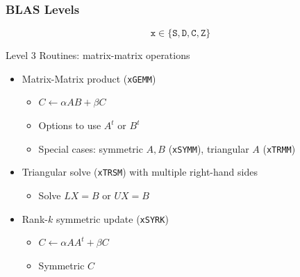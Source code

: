 \documentclass[xcolor={x11names,svgnames},x11names,svgnames]{beamer}
\newcommand{\red}{\alert}
\begin{document}
\begin{frame}
  \frametitle{BLAS Levels}

  \[
    \texttt{x} \in \{ \texttt{S}, \texttt{D}, \texttt{C}, \texttt{Z} \}
  \]
  
  \begin{block}{Level 3 Routines: \red{matrix-matrix} operations}
    \begin{itemize}
    \item Matrix-Matrix product (\texttt{xGEMM}) 
      \begin{itemize}
      \item $C \gets \alpha AB + \beta C$
      \item Options to use $A^t$ or $B^t$
      \item Special cases: symmetric $A,B$ (\texttt{xSYMM}), triangular $A$ (\texttt{xTRMM})
      \end{itemize}

      \medskip
      
    \item Triangular solve (\texttt{xTRSM}) with multiple right-hand sides
      \begin{itemize}
      \item Solve $LX = B$ or $UX = B$
      \end{itemize}

      \medskip
      
    \item Rank-$k$ symmetric update (\texttt{xSYRK})
      \begin{itemize}
      \item $C \gets \alpha AA^t + \beta C$ 
      \item Symmetric $C$
      \end{itemize}
    \end{itemize}
  \end{block}
\end{frame}

\end{document}
